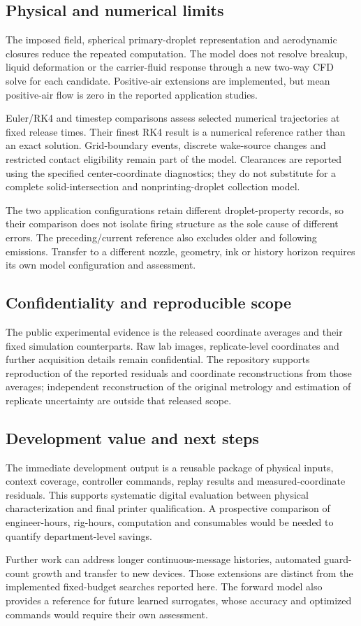 \subsection{Physical and numerical limits}
The imposed field, spherical primary-droplet representation and aerodynamic closures reduce the repeated computation. The model does not resolve breakup, liquid deformation or the carrier-fluid response through a new two-way CFD solve for each candidate. Positive-air extensions are implemented, but mean positive-air flow is zero in the reported application studies.

Euler/RK4 and timestep comparisons assess selected numerical trajectories at fixed release times. Their finest RK4 result is a numerical reference rather than an exact solution. Grid-boundary events, discrete wake-source changes and restricted contact eligibility remain part of the model. Clearances are reported using the specified center-coordinate diagnostics; they do not substitute for a complete solid-intersection and nonprinting-droplet collection model.

The two application configurations retain different droplet-property records, so their comparison does not isolate firing structure as the sole cause of different errors. The preceding/current reference also excludes older and following emissions. Transfer to a different nozzle, geometry, ink or history horizon requires its own model configuration and assessment.

\subsection{Confidentiality and reproducible scope}
The public experimental evidence is the released coordinate averages and their fixed simulation counterparts. Raw lab images, replicate-level coordinates and further acquisition details remain confidential. The repository supports reproduction of the reported residuals and coordinate reconstructions from those averages; independent reconstruction of the original metrology and estimation of replicate uncertainty are outside that released scope.

\subsection{Development value and next steps}
The immediate development output is a reusable package of physical inputs, context coverage, controller commands, replay results and measured-coordinate residuals. This supports systematic digital evaluation between physical characterization and final printer qualification. A prospective comparison of engineer-hours, rig-hours, computation and consumables would be needed to quantify department-level savings.

Further work can address longer continuous-message histories, automated guard-count growth and transfer to new devices. Those extensions are distinct from the implemented fixed-budget searches reported here. The forward model also provides a reference for future learned surrogates, whose accuracy and optimized commands would require their own assessment.
